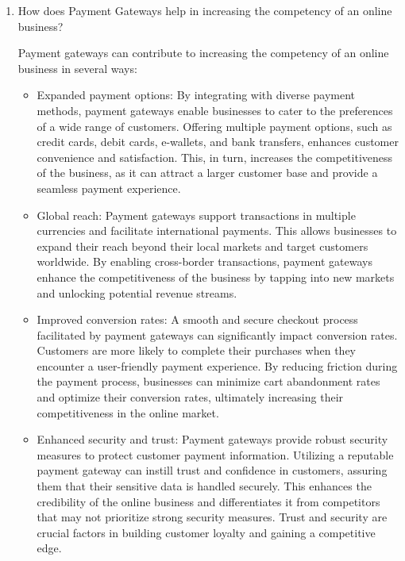 \begin{enumerate}
 \item How does Payment Gateways help in increasing the competency of an online business?

Payment gateways can contribute to increasing the competency of an online business in several ways:
\begin{itemize}


    \item Expanded payment options: By integrating with diverse payment methods, payment gateways enable businesses to cater to the preferences of a wide range of customers. Offering multiple payment options, such as credit cards, debit cards, e-wallets, and bank transfers, enhances customer convenience and satisfaction. This, in turn, increases the competitiveness of the business, as it can attract a larger customer base and provide a seamless payment experience.

\item Global reach: Payment gateways support transactions in multiple currencies and facilitate international payments. This allows businesses to expand their reach beyond their local markets and target customers worldwide. By enabling cross-border transactions, payment gateways enhance the competitiveness of the business by tapping into new markets and unlocking potential revenue streams.

\item Improved conversion rates: A smooth and secure checkout process facilitated by payment gateways can significantly impact conversion rates. Customers are more likely to complete their purchases when they encounter a user-friendly payment experience. By reducing friction during the payment process, businesses can minimize cart abandonment rates and optimize their conversion rates, ultimately increasing their competitiveness in the online market.

\item Enhanced security and trust: Payment gateways provide robust security measures to protect customer payment information. Utilizing a reputable payment gateway can instill trust and confidence in customers, assuring them that their sensitive data is handled securely. This enhances the credibility of the online business and differentiates it from competitors that may not prioritize strong security measures. Trust and security are crucial factors in building customer loyalty and gaining a competitive edge.


\end{itemize}
\end{enumerate}
